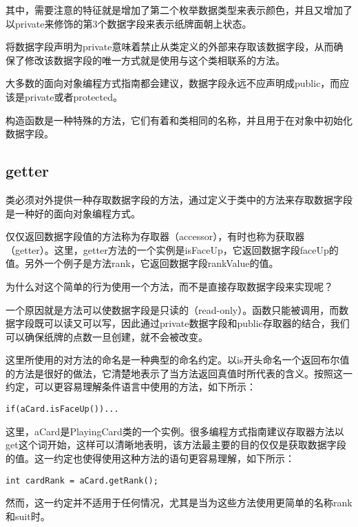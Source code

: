 其中，需要注意的特征就是增加了第二个枚举数据类型来表示颜色，并且又增加了以private来修饰的第3个数据字段来表示纸牌面朝上状态。

将数据字段声明为private意味着禁止从类定义的外部来存取该数据字段，从而确保了修改该数据字段的唯一方式就是使用与这个类相联系的方法。

大多数的面向对象编程方式指南都会建议，数据字段永远不应声明成public，而应该是private或者protected。

构造函数是一种特殊的方法，它们有着和类相同的名称，并且用于在对象中初始化数据字段。

\subsection{getter}


类必须对外提供一种存取数据字段的方法，通过定义于类中的方法来存取数据字段是一种好的面向对象编程方式。

仅仅返回数据字段值的方法称为存取器（accessor），有时也称为获取器（getter）。这里，getter方法的一个实例是isFaceUp，它返回数据字段faceUp的值。另外一个例子是方法rank，它返回数据字段rankValue的值。


为什么对这个简单的行为使用一个方法，而不是直接存取数据字段来实现呢？

一个原因就是方法可以使数据字段是只读的（read-only）。函数只能被调用，而数据字段既可以读又可以写，因此通过private数据字段和public存取器的结合，我们可以确保纸牌的点数一旦创建，就不会被改变。


这里所使用的对方法的命名是一种典型的命名约定。以is开头命名一个返回布尔值的方法是很好的做法，它清楚地表示了当方法返回真值时所代表的含义。按照这一约定，可以更容易理解条件语言中使用的方法，如下所示：

\begin{lstlisting}[language={[Sharp]C}]
if(aCard.isFaceUp())...
\end{lstlisting}


这里，aCard是PlayingCard类的一个实例。很多编程方式指南建议存取器方法以get这个词开始，这样可以清晰地表明，该方法最主要的目的仅仅是获取数据字段的值。这一约定也使得使用这种方法的语句更容易理解，如下所示：



\begin{lstlisting}[language={[Sharp]C}]
int cardRank = aCard.getRank();
\end{lstlisting}

然而，这一约定并不适用于任何情况，尤其是当为这些方法使用更简单的名称rank和suit时。

